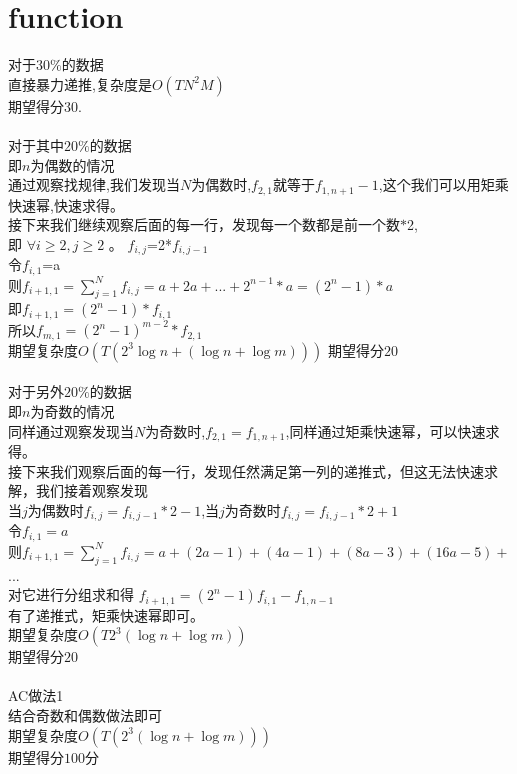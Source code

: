 \documentclass{article}
\begin{document}
\section{function}
对于$30\%$的数据\\
直接暴力递推,复杂度是$O(TN^2M)$\\
期望得分$30$.\\
\\
对于其中$20\%$的数据\\
即$n$为偶数的情况\\
通过观察找规律,我们发现当$N$为偶数时,$f_{2,1}$就等于$f_{1,n+1}-1$,这个我们可以用矩乘快速幂,快速求得。\\
接下来我们继续观察后面的每一行，发现每一个数都是前一个数$*$2,\\
即  ${\forall i\geq 2,j\geq 2}$  。 $f_{i,j}$=2*$f_{i,j-1}$\\
令$f_{i,1}$=a\\
则$f_{i+1,1}=\sum_{j=1}^Nf_{i,j}=a+2a+...+2^{n-1}*a= (2^n-1)*a$\\
即$f_{i+1,1}=(2^n-1)*f_{i,1}$\\
所以$f_{m,1}=(2^n-1)^{m-2}*f_{2,1}$\\
期望复杂度$O(T(2^3\log{n}+(\log{n}+\log{m})))$
期望得分$20$\\
\\
对于另外$20\%$的数据\\
即$n$为奇数的情况\\
同样通过观察发现当$N$为奇数时,$f_{2,1}=f_{1,n+1}$,同样通过矩乘快速幂，可以快速求得。\\
接下来我们观察后面的每一行，发现任然满足第一列的递推式，但这无法快速求解，我们接着观察发现 \\
当$j$为偶数时$f_{i,j}=f_{i,j-1}*2-1$,当$j$为奇数时$f_{i,j}=f_{i,j-1} *2+1$\\
令$f_{i,1}=a$\\
则$f_{i+1,1}=\sum_{j=1}^Nf_{i,j}=a+(2a-1)+(4a-1)+(8a-3)+(16a-5)+$...\\
对它进行分组求和得 $f_{i+1,1}=(2^n-1)f_{i,1}-f_{1,n-1}$ \\
有了递推式，矩乘快速幂即可。\\
期望复杂度$O(T2^3(\log{n}+\log{m}))$\\
期望得分$20$\\
\\
AC做法1\\
结合奇数和偶数做法即可\\
期望复杂度$O(T(2^3(\log{n}+\log{m})))$\\
期望得分$100$分\\
\end{document}
